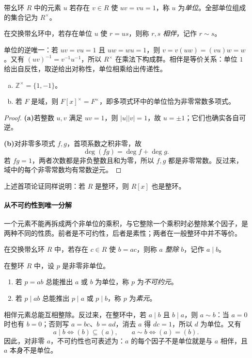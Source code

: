 \documentclass[lang=cn,a4paper,fontset=none,zihao=false,10pt,openany,twoside]{beautybook}
\numberwithin{algorithm}{chapter}
\begin{document}
\begin{definition}[单位与相伴元素]
带幺环 $R$ 中的元素 $u$ 若存在 $v\in R$ 使 $uv=vu=1$，称 $u$ 为\emph{单位}。全部单位组成的集合记为 $R^\times$。

在交换带幺环中，若存在单位 $u$ 使 $r=us$，则称 $r,s$ \emph{相伴}，记作 $r\sim s$。
\end{definition}
单位的逆唯一：若 $uv=vu=1$ 且 $uw=wu=1$，则 $v=v(uw)=(vu)w=w$。又有 $(uv)^{-1}=v^{-1}u^{-1}$，所以 $R^\times$ 在乘法下构成群。相伴是等价关系：单位 $1$ 给出自反性，取逆给出对称性，单位相乘给出传递性。

\begin{example}[整数与多项式的单位]
\begin{enumerate}[(a)]
\item $\mathbb Z^\times=\{1,-1\}$。
\item 若 $F$ 是域，则 $F[x]^\times=F^\times$，即多项式环中的单位恰为非零常数多项式。
\end{enumerate}
\end{example}
\begin{proof}
\par\smallskip\noindent\textbf{(a)}\quad 若整数 $u,v$ 满足 $uv=1$，则 $|u||v|=1$，故 $u=\pm1$；它们也确实各自可逆。
\par\smallskip\noindent\textbf{(b)}\quad 对非零多项式 $f,g$，首项系数之积非零，故
\[
 \deg(fg)=\deg f+\deg g.
\]
若 $fg=1$，两者次数都是非负整数且和为零，所以 $f,g$ 都是非零常数。反过来，域中的每个非零常数均有常数逆元。
\end{proof}
上述首项论证同样说明：若 $R$ 是整环，则 $R[x]$ 也是整环。

\paragraph{从不可约性到唯一分解}
一个元素不能再拆成两个非单位的乘积，与它整除一个乘积时必整除某个因子，是两种不同的性质。前者是不可约性，后者是素性；两者在一般整环中并不等价。

\begin{definition}[整除、不可约元与素元]
在交换带幺环 $R$ 中，若存在 $c\in R$ 使 $b=ac$，则称 $a$ \emph{整除} $b$，记作 $a\mid b$。

在整环 $R$ 中，设 $p$ 是非零非单位。
\begin{enumerate}[(1)]
\item 若 $p=ab$ 总能推出 $a$ 或 $b$ 为单位，称 $p$ 为\emph{不可约元}。
\item 若 $p\mid ab$ 总能推出 $p\mid a$ 或 $p\mid b$，称 $p$ 为\emph{素元}。
\end{enumerate}
\end{definition}
相伴元素总能互相整除。反过来，在整环中，若 $a\mid b$ 且 $b\mid a$，则 $a\sim b$：当 $a=0$ 时也有 $b=0$；否则写 $a=bc$、$b=ad$，消去 $a$ 得 $dc=1$，所以 $d$ 为单位。又有
\[
 a\mid b\Longleftrightarrow(b)\subseteq(a),\qquad
 a\sim b\Longleftrightarrow(a)=(b).
\]
因此，对非零 $a$，不可约性也可表述为：$a$ 的每个因子不是单位就是与 $a$ 相伴，且 $a$ 本身不是单位。
\end{document}
